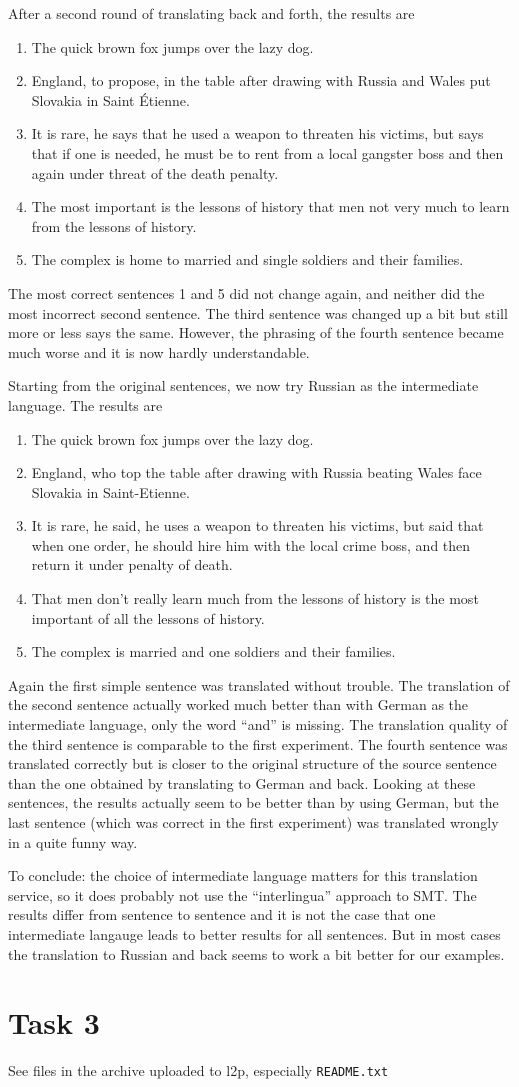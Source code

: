 \documentclass[%
   11pt,              %
   ngerman,           %
   a4paper,           %
   DIV11,             %
]{scrartcl}%
\begin{document}
After a second round of translating back and forth, the results are
\begin{enumerate}
	\item The quick brown fox jumps over the lazy dog. 
	\item England, to propose, in the table after drawing with Russia and Wales put Slovakia in Saint Étienne.
	\item It is rare, he says that he used a weapon to threaten his victims, but says that if one is needed, he must be to rent from a local gangster boss and then again under threat of the death penalty.
	\item The most important is the lessons of history that men not very much to learn from the lessons of history.
	\item The complex is home to married and single soldiers and their families.
\end{enumerate}
The most correct sentences 1 and 5 did not change again, and neither did the most incorrect second sentence. The third sentence was changed up a bit but still more or less says the same. However, the phrasing of the fourth sentence became much worse and it is now hardly understandable. \par
Starting from the original sentences, we now try Russian as the intermediate language. The results are
\begin{enumerate}
	\item The quick brown fox jumps over the lazy dog. 
	\item England, who top the table after drawing with Russia beating Wales face Slovakia in Saint-Etienne. 
	\item It is rare, he said, he uses a weapon to threaten his victims, but said that when one order, he should hire him with the local crime boss, and then return it under penalty of death. 
	\item That men don't really learn much from the lessons of history is the most important of all the lessons of history. 
	\item The complex is married and one soldiers and their families.
\end{enumerate}
Again the first simple sentence was translated without trouble. The translation of the second sentence actually worked much better than with German as the intermediate language, only the word ``and'' is missing. The translation quality of the third sentence is comparable to the first experiment. The fourth sentence was translated correctly but is closer to the original structure of the source sentence than the one obtained by translating to German and back. Looking at these sentences, the results actually seem to be better than by using German, but the last sentence (which was correct in the first experiment) was translated wrongly in a quite funny way. \par
 To conclude: the choice of intermediate language matters for this translation service, so it does probably not use the ``interlingua'' approach to SMT. The results differ from sentence to sentence and it is not the case that one intermediate langauge leads to better results for all sentences. But in most cases the translation to Russian and back seems to work a bit better for our examples.

\section*{Task 3}

See files in the archive uploaded to l2p, especially \texttt{README.txt}
\end{document}
